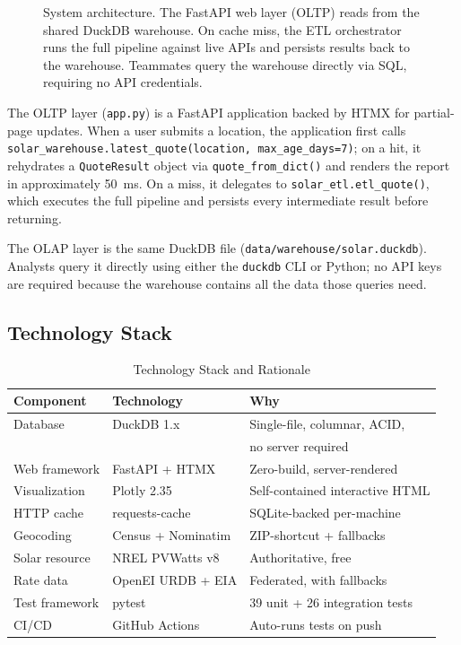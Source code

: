 \documentclass[10pt, conference]{IEEEtran}
\begin{document}
\begin{figure}[H]
\caption{System architecture. The FastAPI web layer (OLTP) reads from the shared DuckDB warehouse. On cache miss, the ETL orchestrator runs the full pipeline against live APIs and persists results back to the warehouse. Teammates query the warehouse directly via SQL, requiring no API credentials.}
\label{fig:architecture}
\end{figure}

The OLTP layer (\texttt{app.py}) is a FastAPI application backed by HTMX for partial-page updates. When a user submits a location, the application first calls \texttt{solar\_warehouse.latest\_quote(location, max\_age\_days=7)}; on a hit, it rehydrates a \texttt{QuoteResult} object via \texttt{quote\_from\_dict()} and renders the report in approximately 50~ms. On a miss, it delegates to \texttt{solar\_etl.etl\_quote()}, which executes the full pipeline and persists every intermediate result before returning.

The OLAP layer is the same DuckDB file (\texttt{data/warehouse/solar.duckdb}). Analysts query it directly using either the \texttt{duckdb} CLI or Python; no API keys are required because the warehouse contains all the data those queries need.

\subsection{Technology Stack}

\begin{table}[H]
\centering
\caption{Technology Stack and Rationale}
\label{tab:tech}
\small
\begin{tabular}{lll}
\toprule
\textbf{Component} & \textbf{Technology} & \textbf{Why} \\
\midrule
Database & DuckDB 1.x & Single-file, columnar, ACID, \\
                     &                & no server required \\
Web framework & FastAPI + HTMX & Zero-build, server-rendered \\
Visualization & Plotly 2.35 & Self-contained interactive HTML \\
HTTP cache & requests-cache & SQLite-backed per-machine \\
Geocoding & Census + Nominatim & ZIP-shortcut + fallbacks \\
Solar resource & NREL PVWatts v8 & Authoritative, free \\
Rate data & OpenEI URDB + EIA & Federated, with fallbacks \\
Test framework & pytest & 39 unit + 26 integration tests \\
CI/CD & GitHub Actions & Auto-runs tests on push \\
\bottomrule
\end{tabular}
\end{table}
\end{document}
